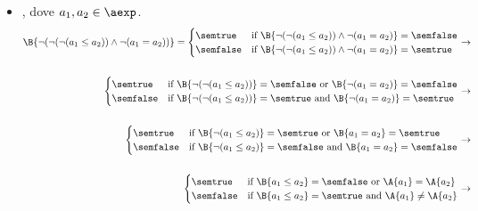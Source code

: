 {\begin{enumerate}[label=\alph*)]
\begin{itemize}
    \item {}, dove $a_1, a_2 \in \aexp$. \\
    \begin{align*}
      \B{\lnot (\lnot (\lnot (a_1 \leq a_2)) \land \lnot (a_1 = a_2) )} =
      \begin{cases}
      \semtrue &
      \mbox{if} \ \B{\lnot (\lnot ( a_1 \leq a_2))
                  \land
                  \lnot (a_1 = a_2)}= \semfalse \\
      \semfalse &
      \mbox{if} \ \B{\lnot (\lnot ( a_1 \leq a_2))
                  \land
                  \lnot (a_1 = a_2)}= \semtrue \\
      \end{cases}
      \rightarrow \\ \\
      \begin{cases}
      \semtrue &
      \mbox{if} \ \B{\lnot (\lnot ( a_1 \leq a_2))} = \semfalse
                  \mbox{ or }
                  \B{\lnot (a_1 = a_2)}= \semfalse \\
      \semfalse &
      \mbox{if} \ \B{\lnot (\lnot ( a_1 \leq a_2))} = \semtrue
                  \mbox{ and }
                  \B{\lnot (a_1 = a_2)}= \semtrue \\
      \end{cases}
      \rightarrow \\ \\
      \begin{cases}
      \semtrue &
      \mbox{if} \ \B{\lnot ( a_1 \leq a_2)} = \semtrue
                  \mbox{ or }
                  \B{a_1 = a_2}= \semtrue \\
      \semfalse &
      \mbox{if} \ \B{\lnot ( a_1 \leq a_2)} = \semfalse
                  \mbox{ and }
                  \B{a_1 = a_2}= \semfalse \\
      \end{cases}
      \rightarrow \\ \\
      \begin{cases}
      \semtrue &
      \mbox{if} \ \B{a_1 \leq a_2} = \semfalse
                  \mbox{ or }
                  \A{a_1} = \A{a_2} \\
      \semfalse &
      \mbox{if} \ \B{a_1 \leq a_2} = \semtrue
                  \mbox{ and }
                  \A{a_1} \neq \A{a_2} \\
      \end{cases}
      \rightarrow \\ \\

\end{align*}
\end{itemize}
\end{enumerate}}
